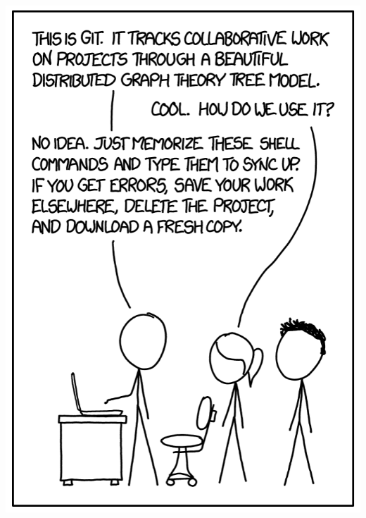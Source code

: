 \documentclass[10pt]{beamer}
\begin{document}
\begin{frame}{}
    \centerline{\includegraphics[height=0.9\textheight]{img/bd2.png}}
\end{frame}
\end{document}
